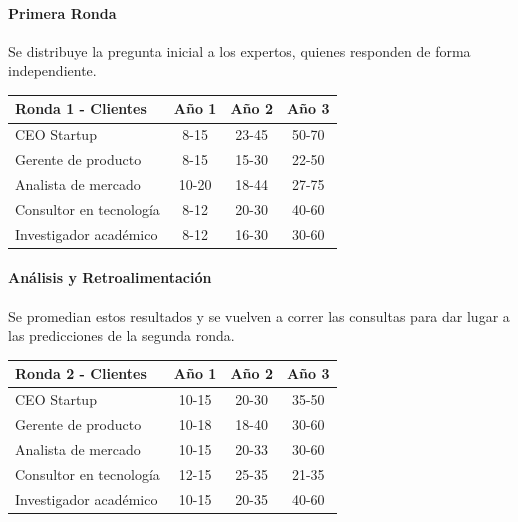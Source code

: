 \paragraph{Primera Ronda}

Se distribuye la pregunta inicial a los expertos, quienes responden de forma independiente.

\begin{center}
\begin{tabular}{|l|c|c|c|}
\hline
\textbf{Ronda 1 - Clientes} & \textbf{Año 1} & \textbf{Año 2} & \textbf{Año 3} \\
\hline
CEO Startup & 8-15 & 23-45 & 50-70 \\
\hline
Gerente de producto & 8-15 & 15-30 & 22-50 \\
\hline
Analista de mercado & 10-20 & 18-44 & 27-75 \\
\hline
Consultor en tecnología & 8-12 & 20-30 & 40-60 \\
\hline
Investigador académico & 8-12 & 16-30 & 30-60 \\
\hline
\end{tabular}
\end{center}

\paragraph{Análisis y Retroalimentación}

Se promedian estos resultados y se vuelven a correr las consultas para dar lugar a las predicciones de la segunda ronda.

\begin{center}
\begin{tabular}{|l|c|c|c|}
\hline
\textbf{Ronda 2 - Clientes} & \textbf{Año 1} & \textbf{Año 2} & \textbf{Año 3} \\
\hline
CEO Startup & 10-15 & 20-30 & 35-50 \\
\hline
Gerente de producto & 10-18 & 18-40 & 30-60 \\
\hline
Analista de mercado & 10-15 & 20-33 & 30-60 \\
\hline
Consultor en tecnología & 12-15 & 25-35 & 21-35 \\
\hline
Investigador académico & 10-15 & 20-35 & 40-60 \\
\hline
\end{tabular}
\end{center}

